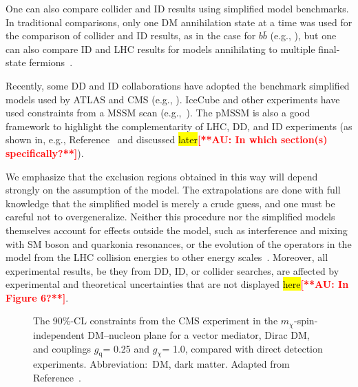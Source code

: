 \documentclass{ar-1col}
\newcommand{\chiDM}{\ensuremath{\chi}\xspace}
\newcommand{\gDM}{\ensuremath{g_{\chiDM}}\xspace}
\newcommand{\gdm}{\gDM}
\newcommand{\gq}{$g_{\mathrm{q}}$\xspace}
\newcommand{\mdm}{\ensuremath{m_{\chiDM}}\xspace}
\begin{document}
One can also compare collider and ID results using
simplified model benchmarks. In traditional comparisons, only one
DM annihilation state at a time was used for the comparison
of collider and ID results, as in the case for $b\bar{b}$ (e.g., ), but one can also compare ID and
LHC results for models annihilating to multiple final-state
fermions~\cite{Carpenter:2016thc}.

Recently, some DD and ID collaborations have adopted the benchmark
simplified models used by ATLAS and CMS (e.g.,
). IceCube and other
experiments have used constraints from a MSSM scan (e.g.,~). The pMSSM is also a good framework
to highlight the complementarity of LHC, DD, and ID experiments (as shown in, e.g.,
Reference~ and discussed \hl{later}\textbf{\textcolor{red}{[**AU: In which section(s) specifically?**]}}).

\begin{marginnote}[]
\end{marginnote}

We emphasize that the exclusion regions obtained in this
way will depend strongly on the assumption of the model. The
extrapolations are done with full knowledge that the simplified
model is merely a crude guess, and one must be careful not to
overgeneralize. Neither this procedure nor the
simplified models themselves account for effects outside the
model, such as interference and mixing with SM boson and quarkonia
resonances, or the evolution of the operators in the model from
the LHC collision energies to other energy
scales~\cite{DEramo:2014nmf}. Moreover, all experimental results,
be they from DD, ID, or collider searches, are affected by experimental and
theoretical uncertainties that are not displayed \hl{here}\textbf{\textcolor{red}{[**AU: In Figure 6?**]}}.

\begin{figure}[!htpb]
\caption{The 90\%-CL constraints from the CMS experiment in the
\mdm-spin-independent DM--nucleon plane for a vector mediator,
Dirac DM, and couplings \gq = 0.25 and \gdm = 1.0, compared with direct detection
experiments. Abbreviation:\ DM, dark matter. Adapted from Reference~.} \label{fig:SICMS}
\end{figure}
\end{document}
